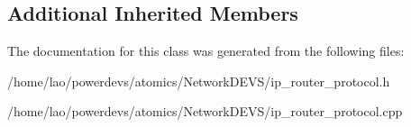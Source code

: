 \subsection*{Additional Inherited Members}


The documentation for this class was generated from the following files\+:\begin{DoxyCompactItemize}
\item 
/home/lao/powerdevs/atomics/\+Network\+D\+E\+V\+S/ip\+\_\+router\+\_\+protocol.\+h\item 
/home/lao/powerdevs/atomics/\+Network\+D\+E\+V\+S/ip\+\_\+router\+\_\+protocol.\+cpp\end{DoxyCompactItemize}
